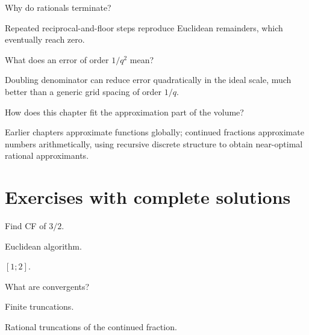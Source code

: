 \begin{problem}\label{prob:ii25-problem-10}
Why do rationals terminate?
\end{problem}
\begin{solution}
Repeated reciprocal-and-floor steps reproduce Euclidean remainders, which eventually reach zero.
\end{solution}

\begin{problem}\label{prob:ii25-problem-11}
What does an error of order $1/q^2$ mean?
\end{problem}
\begin{solution}
Doubling denominator can reduce error quadratically in the ideal scale, much better than a generic grid spacing of order $1/q$.
\end{solution}

\begin{problem}\label{prob:ii25-problem-12}
How does this chapter fit the approximation part of the volume?
\end{problem}
\begin{solution}
Earlier chapters approximate functions globally; continued fractions approximate numbers arithmetically, using recursive discrete structure to obtain near-optimal rational approximants.
\end{solution}

\section{Exercises with complete solutions}

\begin{exercise}\label{exr:ii25-01}
Find CF of $3/2$.
\end{exercise}
\begin{hint}
Euclidean algorithm.
\end{hint}
\begin{solution}
$[1;2]$.
\end{solution}

\begin{exercise}\label{exr:ii25-02}
What are convergents?
\end{exercise}
\begin{hint}
Finite truncations.
\end{hint}
\begin{solution}
Rational truncations of the continued fraction.
\end{solution}

